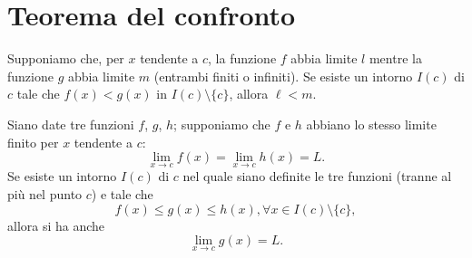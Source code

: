 \documentclass{book}
\begin{document}
\section{Teorema del confronto}

\begin{theorem}
    Supponiamo che, per \( x \) tendente a \( c \), la funzione \( f \) abbia limite \( l \) mentre la funzione \( g \) abbia limite \( m \) (entrambi finiti o infiniti). Se esiste un intorno \( I(c) \) di \( c \) tale che \( f(x) < g(x) \) in \( I(c) \setminus \{c\} \), allora \( \ell < m \).
\end{theorem}

\begin{theorem}
    Siano date tre funzioni \(f\), \(g\), \(h\); supponiamo che \(f\) e \(h\) abbiano lo stesso limite finito per \(x\) tendente a \(c\):
    \[\lim_{x \to c} f(x) = \lim_{x \to c} h(x) = L.\]
    Se esiste un intorno \(I(c)\) di \(c\) nel quale siano definite le tre funzioni (tranne al più nel punto \(c\)) e tale che
    \[f(x) \leq g(x) \leq h(x), \forall x \in I(c) \setminus \{c\},\]
    allora si ha anche
    \[\lim_{x \to c} g(x) = L.\]
\end{theorem}
\end{document}

